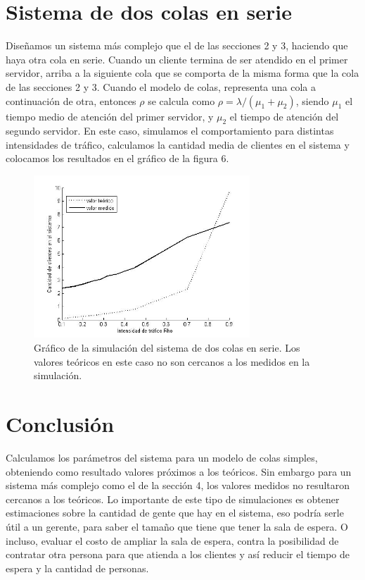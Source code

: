\documentclass[10pt,journal,compsoc]{IEEEtran}
\begin{document}
\section{Sistema de dos colas en serie} %
Dise\~namos un sistema m\'as complejo que el de las secciones 2 y 3, haciendo que haya otra cola en serie. 
Cuando un cliente termina de ser atendido en el primer servidor, arriba a la siguiente cola
que se comporta de la misma forma que la cola de las secciones 2 y 3.
Cuando el modelo de colas, representa una cola a continuaci\'on de otra, entonces $\rho$ se calcula como
$\rho = \lambda/(\mu_1+\mu_2)$, siendo $\mu_1$ el tiempo medio de atenci\'on del primer servidor, y 
$\mu_2$ el tiempo de atenci\'on del segundo servidor.
En este caso, simulamos el comportamiento para distintas intensidades de tr\'afico, calculamos
la cantidad media de clientes en el sistema y colocamos los resultados en el gr\'afico de la figura
6.

\begin{figure}[t]%
\label{fig:puntodos}
\begin{center}
\centering
\includegraphics[width=3.2in]{plot_L}
\caption{Gr\'afico de la simulaci\'on del sistema de dos colas en serie. Los valores te\'oricos en este caso no son cercanos a los medidos en la simulaci\'on.}
\end{center}
\end{figure}


\section{Conclusi\'on} %
Calculamos los par\'ametros del sistema para un modelo de colas simples, obteniendo como resultado valores
pr\'oximos a los te\'oricos. Sin embargo para un sistema m\'as complejo como el de la secci\'on 4, los
valores medidos no resultaron cercanos a los te\'oricos.
Lo importante de este tipo de simulaciones es obtener estimaciones sobre la cantidad de gente que hay en el sistema,
eso podr\'ia serle \'util a un gerente, para saber el tama\~no que tiene que tener la sala de espera. O incluso,
evaluar el costo de ampliar la sala de espera, contra la posibilidad de contratar otra persona para que atienda a 
los clientes y as\'i reducir el tiempo de espera y la cantidad de personas. 
\end{document}
